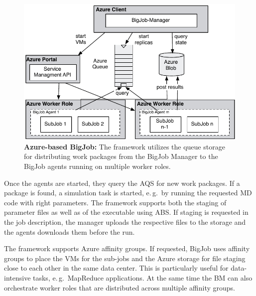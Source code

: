 \documentclass[conference,final]{IEEEtran}
\newcommand{\up}{\vspace*{-1em}}
\newcommand{\alnote}[1]{ {\textcolor{blue} { ***AL: #1 }}}
\newcommand{\jhanote}[1]{ {\textcolor{red} { ***SJ: #1 }}}
\newcommand{\alnote}[1]{}
\newcommand{\jhanote}[1]{}
\begin{document}


\begin{figure}
    \centering
    \includegraphics[width=.4\textwidth]{figures/bigjob_azure}
    \caption{\textbf{Azure-based BigJob:} The framework
      utilizes the queue storage for distributing work
      packages from the BigJob Manager to the
      BigJob agents running on multiple worker roles.}
    \label{fig:figures_bigjob_azure}
    \up\up
\end{figure}

Once the agents are started, they query the AQS for new work packages.
If a package is found, a simulation task is started, e.\,g.\ by
running the requested MD code with right parameters. The framework
supports both the staging of parameter files as well as of the
executable using ABS. If staging is requested in the job description, 
the manager uploads the respective files
to the storage and the agents downloads them before the run.

The framework supports Azure affinity groups.  %
If requested, BigJob uses affinity groups to place the VMs for the
sub-jobs and the Azure storage for file staging close to each other in
the same data center.  This is particularly useful for data-intensive
tasks, e.\,g.\ MapReduce applications. At the same time the BM can
also orchestrate worker roles that are distributed across multiple
affinity groups.


\end{document}
